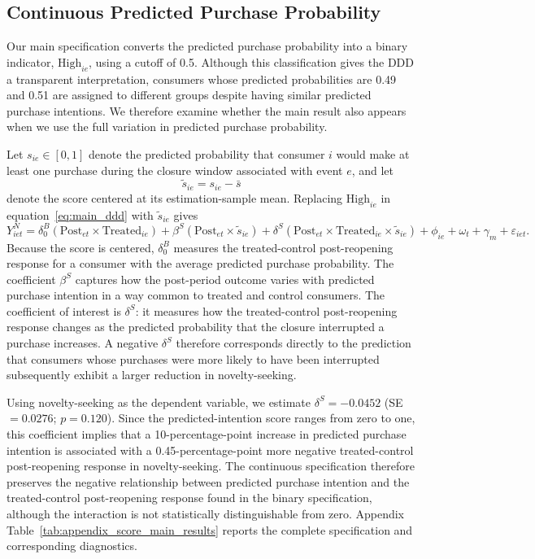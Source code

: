 \documentclass[11 pt]{article}
\begin{document}
\subsection{Continuous Predicted Purchase Probability}
\label{section:robustness_continuous_score}

Our main specification converts the predicted purchase probability into a binary indicator, $\text{High}_{ie}$, using a cutoff of 0.5. Although this classification gives the DDD a transparent interpretation, consumers whose predicted probabilities are 0.49 and 0.51 are assigned to different groups despite having similar predicted purchase intentions. We therefore examine whether the main result also appears when we use the full variation in predicted purchase probability.

Let $s_{ie}\in[0,1]$ denote the predicted probability that consumer $i$ would make at least one purchase during the closure window associated with event $e$, and let
\[
\widetilde{s}_{ie}=s_{ie}-\bar{s}
\]
denote the score centered at its estimation-sample mean. Replacing $\text{High}_{ie}$ in equation~\eqref{eq:main_ddd} with $\widetilde{s}_{ie}$ gives
\begin{equation}
Y^N_{iet}
=
\delta_0^B
\left(
\text{Post}_{et}\times\text{Treated}_{ie}
\right)
+
\beta^S
\left(
\text{Post}_{et}\times\widetilde{s}_{ie}
\right)
+
\delta^S
\left(
\text{Post}_{et}\times\text{Treated}_{ie}\times\widetilde{s}_{ie}
\right)
+
\phi_{ie}+\omega_t+\gamma_m+\varepsilon_{iet}.
\label{eq:continuous_score_robustness}
\end{equation}
Because the score is centered, $\delta_0^B$ measures the treated-control post-reopening response for a consumer with the average predicted purchase probability. The coefficient $\beta^S$ captures how the post-period outcome varies with predicted purchase intention in a way common to treated and control consumers. The coefficient of interest is $\delta^S$: it measures how the treated-control post-reopening response changes as the predicted probability that the closure interrupted a purchase increases. A negative $\delta^S$ therefore corresponds directly to the prediction that consumers whose purchases were more likely to have been interrupted subsequently exhibit a larger reduction in novelty-seeking.

Using novelty-seeking as the dependent variable, we estimate $\delta^S=-0.0452$ (SE $=0.0276$; $p=0.120$). Since the predicted-intention score ranges from zero to one, this coefficient implies that a 10-percentage-point increase in predicted purchase intention is associated with a 0.45-percentage-point more negative treated-control post-reopening response in novelty-seeking. The continuous specification therefore preserves the negative relationship between predicted purchase intention and the treated-control post-reopening response found in the binary specification, although the interaction is not statistically distinguishable from zero. Appendix Table~\ref{tab:appendix_score_main_results} reports the complete specification and corresponding diagnostics.
\end{document}
